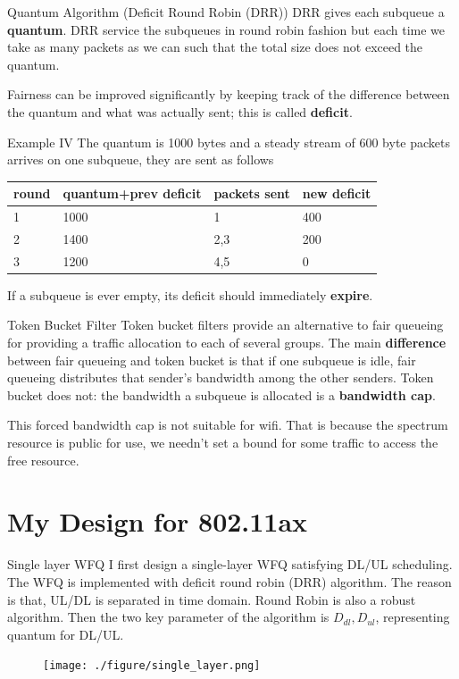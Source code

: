 \documentclass[10pt]{beamer}
\begin{document}
\begin{frame}{Quantum Algorithm (Deficit Round Robin (DRR))}
DRR gives each subqueue a \textbf{quantum}.
DRR service the subqueues in round robin fashion but each time we take as many packets as we can such that the total size does not exceed the quantum.

Fairness can be improved significantly by keeping track of the difference between the quantum and what was actually sent; this is called \textbf{deficit}.
\begin{exampleblock}{Example IV}
The quantum is 1000 bytes and a steady stream of 600 byte packets arrives on one subqueue, they are sent as follows
\end{exampleblock}
\begin{tabular}{llll}
\toprule
round & quantum+prev deficit & packets sent & new deficit\\
\midrule
1 & 1000 & 1 & 400 \\
2 & 1400 & 2,3 & 200 \\
3 & 1200 & 4,5 & 0 \\
\bottomrule
\end{tabular}

If a subqueue is ever empty, its deficit should immediately \textbf{expire}. 
\end{frame}

\begin{frame}{Token Bucket Filter}
Token bucket filters provide an alternative to fair queueing for providing a traffic allocation to each of several groups. 
The main \textbf{difference} between fair queueing and token bucket is that if one subqueue is idle, fair queueing distributes that sender's bandwidth among the other senders. 
Token bucket does not: the bandwidth a subqueue is allocated is a \textbf{bandwidth cap}.

This forced bandwidth cap is not suitable for wifi. 
That is because the spectrum resource is public for use, we needn't set a bound for some traffic to access the free resource. 
\end{frame}

\section{My Design for 802.11ax}
\begin{frame}{Single layer WFQ}
I first design a single-layer WFQ satisfying DL/UL scheduling.
The WFQ is implemented with deficit round robin (DRR) algorithm. 
The reason is that, UL/DL is separated in time domain.
Round Robin is also a robust algorithm. 
Then the two key parameter of the algorithm is $D_{dl}, D_{ul}$, representing quantum for DL/UL. 
\begin{figure}
\texttt{[image: ./figure/single\_layer.png]}
\end{figure}
\end{frame}
\end{document}
